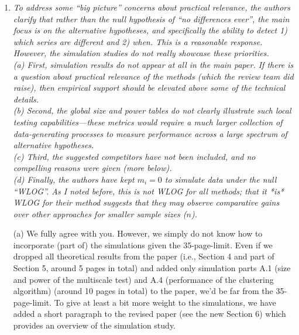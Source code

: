 \documentclass[a4paper,12pt]{article}
\begin{document}
\begin{enumerate}[label=\arabic*.,leftmargin=0.6cm]


\item {\color{black}\textit{To address some “big picture” concerns about practical relevance, the authors clarify that rather than the null hypothesis of “no differences ever”, the main focus is on the alternative hypotheses, and specifically the ability to detect 1) which series are different and 2) when. This is a reasonable response. However, the simulation studies do not really showcase these priorities. \\
(a) First, simulation results do not appear at all in the main paper. If there is a question about practical relevance of the methods (which the review team did raise), then empirical support should be elevated above some of the technical details. \\
(b) Second, the global size and power tables do not clearly illustrate such local testing capabilities—these metrics would require a much larger collection of data-generating processes to measure performance across a large spectrum of alternative hypotheses. \\
(c) Third, the suggested competitors have not been included, and no compelling reasons were given (more below). \\
(d) Finally, the authors have kept $m_i = 0$ to simulate data under the null “WLOG”. As I noted before, this is not WLOG for all methods; that it *is* WLOG for their method suggests that they may observe comparative gains over other approaches for smaller sample sizes ($n$).}}

(a) We fully agree with you. However, we simply do not know how to incorporate (part of) the simulations given the 35-page-limit. Even if we dropped all theoretical results from the paper (i.e., Section 4 and part of Section 5, around 5 pages in total) and added only simulation parts A.1 (size and power of the multiscale test) and A.4 (performance of the clustering algorithm) (around 10 pages in total) to the paper, we'd be far from the 35-page-limit. To give at least a bit more weight to the simulations, we have added a short paragraph to the revised paper (see the new Section 6) which provides an overview of the simulation study. 



\end{enumerate}
\end{document}
